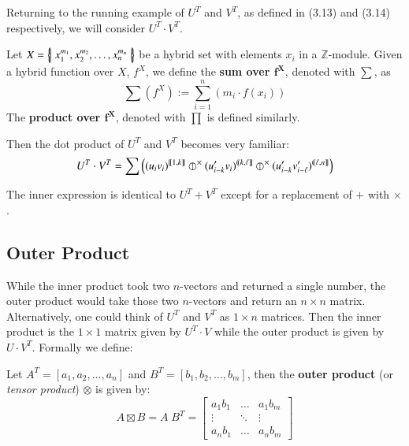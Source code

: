 Returning to the running example of $U^T$ and $V^T$, as defined in (3.13) and (3.14) respectively, we will consider $U^T \cdot V^T$.

\begin{definition}
	Let $X = \hset{x_1^{m_1}, x_2^{m_2}, \ldots , x_n^{m_n} }$ be a hybrid set with elements $x_i$ in a $\mathbb{Z}$-module.
	Given a hybrid function over $X$,  $f^X$, we define the \textbf{sum over $\boldsymbol{f^X}$}, denoted with $\sum$, as
	\begin{equation}
		\sum \! \left( f^X \right)  := \sum_{i=1}^n \left( m_i \cdot f(x_i) \right)
	\end{equation}
	The \textbf{product over $\boldsymbol{f^X}$}, denoted with $\prod$ is defined similarly.
\end{definition}

Then the dot product of $U^T$ and $V^T$ becomes very familiar:
\begin{equation}
	U^T \cdot V^T = \sum \left( (u_i v_i)^{[\![1, k]\!]} 
		\hjoin[\times] (u'_{i-k} v_i)^{(\!(k,\ell]\!]} 
		\hjoin[\times] (u'_{i-k} v'_{i-\ell})^{(\!(\ell,n]\!]} \right)
\end{equation}

The inner expression is identical to $U^T + V^T$ except for a replacement of $+$ with $\times$.




\subsection{Outer Product}

While the inner product took two $n$-vectors and returned a single number,
the outer product would take those two $n$-vectors and return an $n \times n$ matrix.
Alternatively, one could think of $U^T$ and $V^T$ as $1\times n$ matrices.
Then the inner product is the $1\times 1$ matrix given by $U^T \cdot V$ 
while the outer product is given by $U \cdot V^T$. Formally we define:

\begin{definition}
	Let $A^T = [ a_1, a_2, \ldots, a_n]$ and $B^T = [ b_1, b_2, \ldots, b_m]$,
	then the \textbf{outer product} (or \emph{tensor product}) $\otimes$ is given by:
	\begin{equation}
		A \boxtimes B = A \; B^T = \left[
			\begin{array}{ccc}
				a_1 b_1 & \ldots 	& a_1 b_m \\
				\vdots 	& \ddots & \vdots \\
				a_n b_1 & \ldots 	& a_n b_m
			\end{array}
		\right]
	\end{equation}
\end{definition}

